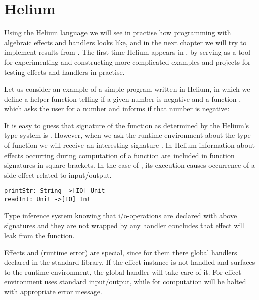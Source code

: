 \section{Helium}

\lstset{language=Haleff, showstringspaces=false}

Using the Helium language we will see in practise how programming with algebraic effects and handlers looks like, and in the next chapter we will try to implement results from \BSaLC{} \cite{mokhov2018build, mokhov2020build}. The first time Helium appears in \cite{biernacki2019abstracting}, by serving as a tool for experimenting and constructing more complicated examples and projects for testing effects and handlers in practise.

Let us consider an example of a simple program written in Helium, in which we define a helper function  telling if a given number is negative and a function , which asks the user for a number and informs if that number is negative:



It is easy to guess that signature of the function  as determined by the Helium's type system is . However, when we ask the runtime environment about the type of function  we will receive an interesting signature . In Helium information about effects occurring during computation of a function are included in function signatures in square brackets. In the case of , its execution causes occurrence of a side effect related to input/output.

\begin{lstlisting}
printStr: String ->[IO] Unit
readInt: Unit ->[IO] Int
\end{lstlisting}

Type inference system knowing that i/o-operations are declared with above signatures and they are not wrapped by any handler concludes that  effect will leak from the  function.

Effects  and  (runtime error) are special, since for them there global handlers declared in the standard library. If the effect instance is not handled and surfaces to the runtime environment, the global handler will take care of it. For effect  environment uses standard input/output, while for  computation will be halted with appropriate error message.

